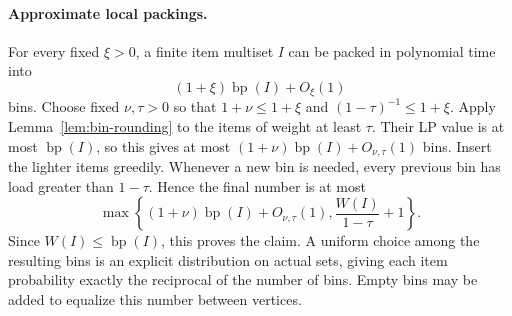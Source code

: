 \documentclass[11pt]{article}
\theoremstyle{definition}\newtheorem{algorithm}{Algorithm}[section]
\numberwithin{equation}{section}
\theoremstyle{remark}\newtheorem*{remark}{Remark}
\begin{document}
\paragraph{Approximate local packings.}
For every fixed $\xi>0$, a finite item multiset $I$ can be packed in
polynomial time into
\[
 (1+\xi)\operatorname{bp}(I)+O_\xi(1)
\]
bins. Choose fixed $\nu,\tau>0$ so that
$1+\nu\le1+\xi$ and $(1-\tau)^{-1}\le1+\xi$.
Apply Lemma~\ref{lem:bin-rounding} to the items of weight at least $\tau$.
Their LP value is at most $\operatorname{bp}(I)$, so this gives at most
$(1+\nu)\operatorname{bp}(I)+O_{\nu,\tau}(1)$ bins.
Insert the lighter items greedily. Whenever a new bin is needed,
every previous bin has load greater than $1-\tau$. Hence the final
number is at most
\[
 \max\left\{(1+\nu)\operatorname{bp}(I)+O_{\nu,\tau}(1),
                   \frac{W(I)}{1-\tau}+1\right\}.
\]
Since $W(I)\le\operatorname{bp}(I)$, this proves the claim.
A uniform choice among the resulting bins is an explicit distribution
on actual sets, giving each item probability exactly the reciprocal
of the number of bins. Empty bins may be added to equalize this number
between vertices.
\end{document}
